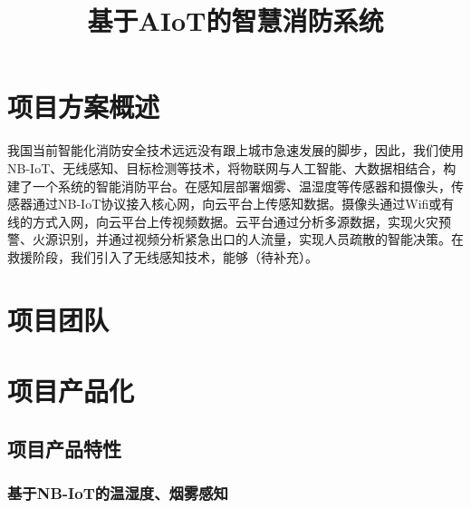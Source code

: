 \documentclass{ctexart}
\begin{document}
	\title{基于AIoT的智慧消防系统}
	\section{项目方案概述}
	我国当前智能化消防安全技术远远没有跟上城市急速发展的脚步，因此，我们使用NB-IoT、无线感知、目标检测等技术，将物联网与人工智能、大数据相结合，构建了一个系统的智能消防平台。在感知层部署烟雾、温湿度等传感器和摄像头，传感器通过NB-IoT协议接入核心网，向云平台上传感知数据。摄像头通过Wifi或有线的方式入网，向云平台上传视频数据。云平台通过分析多源数据，实现火灾预警、火源识别，并通过视频分析紧急出口的人流量，实现人员疏散的智能决策。在救援阶段，我们引入了无线感知技术，能够（待补充）。
	\section{项目团队}
	\section{项目产品化}
		\subsection{项目产品特性}
			\subsubsection{基于NB-IoT的温湿度、烟雾感知}
\end{document}
